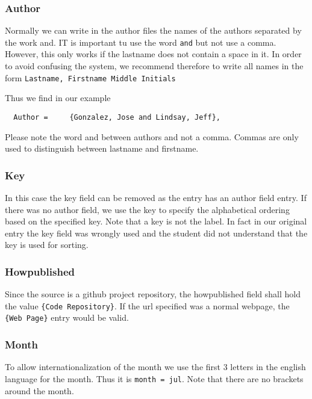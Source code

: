 \subsubsection{Author}\label{s:e:author}

Normally we can write in the author files the names of the authors
separated by the work and. IT is important tu use the word \verb|and|
but not use a comma. However, this only works if the lastname does not
contain a space in it. In order to avoid confusing the system, we
recommend therefore to write all names in the form
\verb|Lastname, Firstname Middle Initials|

Thus we find in our example

\verb|  Author =     {Gonzalez, Jose and Lindsay, Jeff},|

\begin{WARNING}
Please note the word and between authors and not a comma. Commas are
only used to distinguish between lastname and firstname.
\end{WARNING}


\subsubsection{Key}\label{s:e:key}

In this case the key field can be removed as the entry has an author
field entry. If there was no author field, we use the key to specify
the alphabetical ordering based on the specified key. Note that a key is
not the label. In fact in our original entry the key field was wrongly
used and the student did not understand that the key is used for
sorting.

\subsubsection{Howpublished}\label{s:e:howpublished}

Since the source is a github project repository, the howpublished field
shall hold the value \verb|{Code Repository}|. If the
url specified was a normal webpage, the \verb|{Web Page}| entry would be
valid.

\subsubsection{Month}\label{s:e:month}

To allow internationalization of the month we use the first 3 letters
in the english language for the month. Thus it is 
\verb|month = jul|. Note that there are no brackets around the month.

